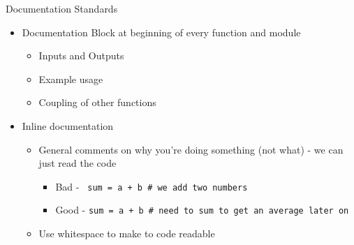 \documentclass[11pt,professionalfonts]{beamer}
\begin{document}
\begin{frame}{Documentation Standards}
    \begin{itemize}
        \item Documentation Block at beginning of every function and module
            \begin{itemize}
                \item Inputs and Outputs
                \item Example usage
                \item Coupling of other functions
            \end{itemize}
        \item Inline documentation
            \begin{itemize}
                \item General comments on why you're doing something (not what) - we can just read the code
                    \begin{itemize}
                        \item Bad - \texttt{ sum = a + b \# we add two numbers}
                        \item Good - \texttt{sum = a + b \# need to sum to get an average later on}
                    \end{itemize}
                \item Use whitespace to make to code readable 
            \end{itemize}
    \end{itemize}
\end{frame}
\end{document}
